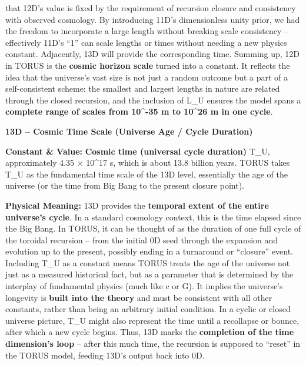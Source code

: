 \documentclass[
]{article}
\begin{document}
that 12D's value is fixed by the requirement of recursion closure and
consistency with observed cosmology\hspace{0pt}. By introducing 11D's
dimensionless unity prior, we had the freedom to incorporate a large
length without breaking scale consistency -- effectively 11D's ``1'' can
scale lengths or times without needing a new physics
constant\hspace{0pt}. Adjacently, 13D will provide the corresponding
time. Summing up, 12D in TORUS is the \textbf{cosmic horizon scale}
turned into a constant. It reflects the idea that the universe's vast
size is not just a random outcome but a part of a self-consistent
scheme: the smallest and largest lengths in nature are related through
the closed recursion, and the inclusion of L\_U ensures the model spans
a \textbf{complete range of scales from 10\^{}-35 m to 10\^{}26 m in one
cycle}.

\textbf{13D -- Cosmic Time Scale (Universe Age / Cycle Duration)}

\textbf{Constant \& Value:} \textbf{Cosmic time (universal cycle
duration)} T\_U, approximately 4.35 × 10\^{}17 s\hspace{0pt}, which is
about 13.8 billion years. TORUS takes T\_U as the fundamental time scale
of the 13D level, essentially the age of the universe (or the time from
Big Bang to the present closure point).

\textbf{Physical Meaning:} 13D provides the \textbf{temporal extent of
the entire universe's cycle}. In a standard cosmology context, this is
the time elapsed since the Big Bang. In TORUS, it can be thought of as
the duration of one full cycle of the toroidal recursion -- from the
initial 0D seed through the expansion and evolution up to the present,
possibly ending in a turnaround or ``closure'' event\hspace{0pt}.
Including T\_U as a constant means TORUS treats the age of the universe
not just as a measured historical fact, but as a parameter that is
determined by the interplay of fundamental physics (much like c or G).
It implies the universe's longevity is \textbf{built into the theory}
and must be consistent with all other constants, rather than being an
arbitrary initial condition\hspace{0pt}. In a cyclic or closed universe
picture, T\_U might also represent the time until a recollapse or
bounce, after which a new cycle begins. Thus, 13D marks the
\textbf{completion of the time dimension's loop} -- after this much
time, the recursion is supposed to ``reset'' in the TORUS model, feeding
13D's output back into 0D.
\end{document}
